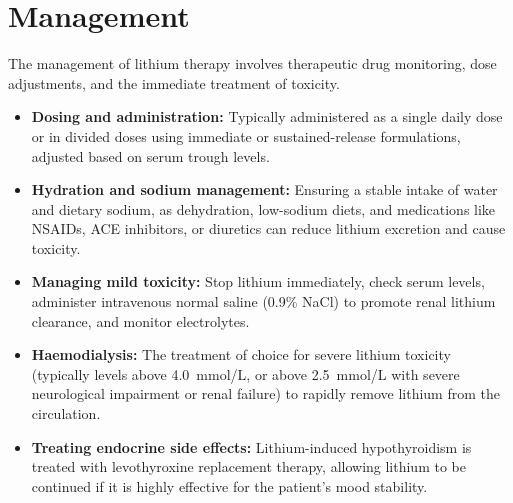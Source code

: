 \section*{Management}
The management of lithium therapy involves therapeutic drug monitoring, dose adjustments, and the immediate treatment of toxicity.
\begin{itemize}
    \item \textbf{Dosing and administration:} Typically administered as a single daily dose or in divided doses using immediate or sustained-release formulations, adjusted based on serum trough levels.
    \item \textbf{Hydration and sodium management:} Ensuring a stable intake of water and dietary sodium, as dehydration, low-sodium diets, and medications like NSAIDs, ACE inhibitors, or diuretics can reduce lithium excretion and cause toxicity.
    \item \textbf{Managing mild toxicity:} Stop lithium immediately, check serum levels, administer intravenous normal saline (0.9\% NaCl) to promote renal lithium clearance, and monitor electrolytes.
    \item \textbf{Haemodialysis:} The treatment of choice for severe lithium toxicity (typically levels above 4.0~mmol/L, or above 2.5~mmol/L with severe neurological impairment or renal failure) to rapidly remove lithium from the circulation.
    \item \textbf{Treating endocrine side effects:} Lithium-induced hypothyroidism is treated with levothyroxine replacement therapy, allowing lithium to be continued if it is highly effective for the patient's mood stability.
\end{itemize}

